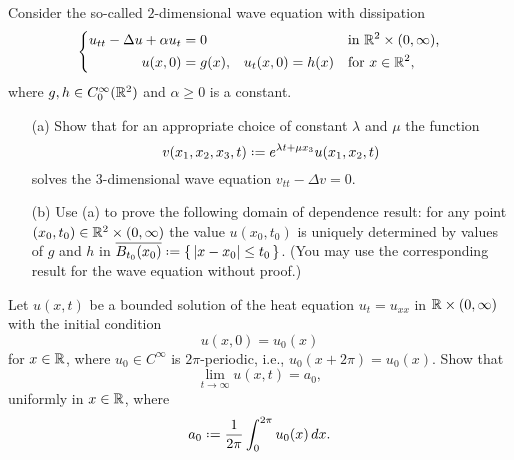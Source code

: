 \begin{problem}
  Consider the so-called \(2\)-dimensional wave equation with dissipation
  \[
    \left\{
      \begin{aligned}
        u_{tt}-\Delta u+\alpha u_t&=0&&&&\text{in \(\mathbb{R}^2\times(0,\infty)\),}\\
        u(x,0)&=g(x),&u_t(x,0)&=h(x)&&\text{for \(x\in\mathbb{R}^2\),}
      \end{aligned}
    \right.
  \]
  where \(g,h\in C_0^\infty(\mathbb{R}^2)\) and \(\alpha\geq 0\) is a constant.
  \begin{itemize}[noitemsep]
  \item[(a)] Show that for an appropriate choice of constant \(\lambda\)
    and \(\mu\) the function
    \[
      v(x_1,x_2,x_3,t)\defeq e^{\lambda t+\mu x_3}u(x_1,x_2,t)
    \]
    solves the \(3\)-dimensional wave equation \(v_{tt}-\Delta v=0\).
  \item[(b)] Use (a) to prove the following domain of dependence result:
    for any point \((x_0,t_0)\in\mathbb{R}^2\times(0,\infty)\) the value
    \(u(x_0,t_0)\) is uniquely determined by values of \(g\) and \(h\) in
    \(\overline{B_{t_0}(x_0)}\defeq\{\,|x-x_0|\leq t_0\,\}\). (You may use
    the corresponding result for the wave equation without proof.)
  \end{itemize}
\end{problem}
\begin{solution}
\end{solution}

\begin{problem}
  Let \(u(x,t)\) be a bounded solution of the heat equation \(u_t=u_{xx}\)
  in \(\mathbb{R}\times(0,\infty)\) with the initial condition
  \[
    u(x,0)=u_0(x)
  \]
  for \(x\in\mathbb{R}\), where \(u_0\in C^\infty\) is \(2\pi\)-periodic, i.e.,
  \(u_0(x+2\pi)=u_0(x)\). Show that
  \[
    \lim_{t\to\infty} u(x,t)=a_0,
  \]
  uniformly in \(x\in\mathbb{R}\), where
  \[
    a_0\defeq\frac{1}{2\pi}\int_0^{2\pi} u_0(x)\diff x.
  \]
\end{problem}
\begin{solution}
\end{solution}


